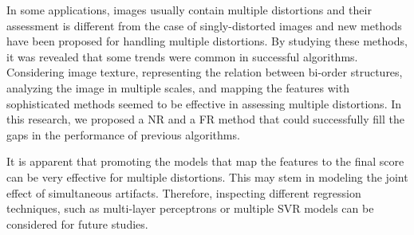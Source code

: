 In some applications, images usually contain multiple distortions and their assessment is different from the case of singly-distorted images and new methods have been proposed for handling multiple distortions. By studying these methods, it was revealed that some trends were common in successful algorithms. Considering image texture, representing the relation between bi-order structures, analyzing the image in multiple scales, and mapping the features with sophisticated methods seemed to be effective in assessing multiple distortions. In this research, we proposed a NR and a FR method that could successfully fill the gaps in the performance of previous algorithms. 

It is apparent that promoting the models that map the features to the final score can be very effective for multiple distortions. This may stem in modeling the joint effect of simultaneous artifacts. Therefore, inspecting different regression techniques, such as multi-layer perceptrons or multiple SVR models can be considered for future studies.  